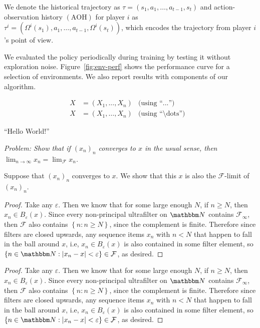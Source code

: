 \documentclass[11pt]{article}
\begin{document}
\begin{multicols}{2}
    We denote the historical trajectory as
    ${ \tau=\left(s_1, a_1, \ldots, a_{t-1}, s_t\right) }$
    and action-observation history $(\mathrm{AOH})$ for
    player $i$ as
    ${ \tau^i=\left(\Omega^i\left(s_1\right), a_1, \ldots, a_{t-1}, \Omega^i\left(s_t\right)\right) }$,
    which encodes the trajectory from player $i$ 's point of view.

    We evaluated the policy periodically during training by testing it without exploration noise.
    Figure~\ref{fig:env-perf} shows the performance curve for a selection of environments. We also report
    results with components of our algorithm.

    \blindtext\blindtext
    \begin{align*}
        X & = \left( X_1, ..., X_n \right)   & \text{(using ``...'')}                 & \\
        X & = \left( X_1, \dots, X_n \right) & \text{(using ``\textbackslash dots'')} &
    \end{align*}
\end{multicols}

``Hello World!''

\textit{Problem: Show that if $(x_n)_n$ converges to $x$ in the usual sense, then
    $\lim_{n \to \infty} x_n = \lim_{\mathcal{F}} x_n$.}

Suppose that $(x_n)_n$ converges to $x$. We show that this $x$ is also the
$\mathcal{F}$-limit of $(x_n)_n$.

\begin{proof}
    Take any $\varepsilon$. Then we know that for some large enough $N$, if $n \geq N$, then
    $x_n \in B_\varepsilon(x)$. Since every non-principal ultrafilter on $\N$ contains
    $\mathcal{F}_\infty$, then $\mathcal{F}$ also contains $ \left\{ n : n \geq N \right\} $,
    since the complement is finite. Therefore since filters are closed upwards, any
    sequence items $x_n$ with $n < N$ that happen to fall in the ball around $x$, i.e, $x_n \in B_\varepsilon(x)$
    is also contained in some filter element, so $\left\{  n \in \N : \lvert x_n - x \rvert < \varepsilon \right\} \in \mathcal{F}$, as desired.

\end{proof}

\begin{proof}
    Take any $\varepsilon$. Then we know that for some large enough $N$, if $n \geq N$, then
    $x_n \in B_\varepsilon(x)$. Since every non-principal ultrafilter on $\N$ contains
    $\mathcal{F}_\infty$, then $\mathcal{F}$ also contains $ \left\{ n : n \geq N \right\} $,
    since the complement is finite. Therefore since filters are closed upwards, any
    sequence items $x_n$ with $n < N$ that happen to fall in the ball around $x$,
    i.e, $x_n \in B_\varepsilon(x)$
    is also contained in some filter element, so
    $\left\{  n \in \N : \lvert x_n - x \rvert < \varepsilon \right\} \in \mathcal{F}$,
    as desired. \qedhere

\end{proof}
\end{document}
